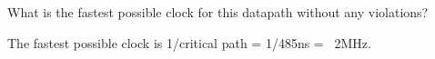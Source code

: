 \begin{blocksection}
\question
What is the fastest possible clock for this datapath without any violations?

\begin{solution}[0.5in]
The fastest possible clock is 1/critical path = 1/485ns =~ 2MHz.
\end{solution}

\end{blocksection}




